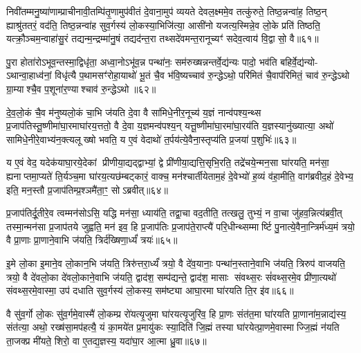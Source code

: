 {\anuvakamend[{का॒मये॑त॒ प्रति॑ष्ठित्यै प॒शून्थ्स॒प्तच॑त्वारिशच्च॥10॥}]}

निवी॑तम्मनु॒ष्या॑णाम्प्राचीनावी॒तम्पि॑तृ॒णामुप॑वीतं दे॒वाना॒मुप॑ व्ययते देवल॒क्ष्ममे॒व तत्कु॑रुते॒ तिष्ठ॒न्नन्वा॑ह॒ तिष्ठ॒न् ह्याश्रु॑ततरं॒ वद॑ति॒ तिष्ठ॒न्नन्वा॑ह सुव॒र्गस्य॑ लो॒कस्या॒भिजि॑त्या॒ आसी॑नो यजत्य॒स्मिन्ने॒व लो॒के प्रति॑ तिष्ठति॒ यत्क्रौ॒ञ्चम॒न्वाहा॑सु॒रं तद्यन्म॒न्द्रम्मा॑नु॒षं तद्यद॑न्त॒रा तथ्सदे॑वमन्त॒रानूच्यꣳ॑ सदेव॒त्वाय॑ वि॒द्वासो॒ वै॥६१॥

पु॒रा होता॑रोऽभूव॒न्तस्मा॒द्विधृ॑ता॒ अध्वा॒नोऽभू॑व॒न्न पन्था॑नः॒ सम॑रुख्षन्नन्तर्वे॒द्य॑न्यः पादो॒ भव॑ति बहिर्वे॒द्य॑न्यो- ऽथान्वा॒हाध्व॑नां॒ विधृ॑त्यै प॒थामसꣳ॑रोहा॒याथो॑ भू॒तं चै॒व भ॑वि॒ष्यच्चाव॑ रु॒न्द्धेऽथो॒ परि॑मितं चै॒वाप॑रिमितं॒ चाव॑ रु॒न्द्धेऽथो ग्रा॒म्याश्चै॒व प॒शूना॑र॒ण्याश्चाव॑ रु॒न्द्धेऽथो॥६२॥

दे॒व॒लो॒कं चै॒व म॑नुष्यलो॒कं चा॒भि ज॑यति दे॒वा वै सा॑मिधे॒नीर॒नूच्य॑ य॒ज्ञं नान्व॑पश्य॒न्थ्स प्र॒जाप॑तिस्तू॒ष्णीमा॑घा॒रमाघा॑रय॒त्ततो॒ वै दे॒वा य॒ज्ञमन्व॑पश्य॒न् यत्तू॒ष्णीमा॑घा॒रमा॑घा॒रय॑ति य॒ज्ञस्यानु॑ख्यात्या॒ अथो॑ सामिधे॒नीरे॒वाभ्य॑न॒क्त्यलूख्षो भवति॒ य ए॒वं वेदाथो॑ त॒र्पय॑त्ये॒वैना॒स्तृप्य॑ति प्र॒जया॑ प॒शुभिः॑॥६३॥

य ए॒वं वेद॒ यदेक॑याघा॒रये॒देकां प्रीणीया॒द्यद्द्वाभ्यां॒ द्वे प्री॑णीया॒द्यत्ति॒सृभि॒रति॒ तद्रे॑चये॒न्मन॒सा घा॑रयति॒ मन॑सा॒ ह्यनाप्तमा॒प्यते॑ ति॒र्यञ्च॒मा घा॑रय॒त्यछ॑म्बट्कारं॒ वाक्च॒ मन॑श्चार्तीयेताम॒हं दे॒वेभ्यो॑ ह॒व्यं व॑हा॒मीति॒ वाग॑ब्रवीद॒हं दे॒वेभ्य॒ इति॒ मन॒स्तौ प्र॒जाप॑तिम्प्र॒श्ञमै॑ता॒ꣳ॒ सोऽब्रवीत्॥६४॥

प्र॒जाप॑तिर्दू॒तीरे॒व त्वम्मन॑सोऽसि॒ यद्धि मन॑सा॒ ध्याय॑ति॒ तद्वा॒चा वद॒तीति॒ तत्खलु॒ तुभ्यं॒ न वा॒चा जु॑हव॒न्नित्य॑ब्रवी॒त् तस्मा॒न्मन॑सा प्र॒जाप॑तये जुह्वति॒ मन॑ इव॒ हि प्र॒जाप॑तिः प्र॒जाप॑ते॒राप्त्यै॑ परि॒धीन्थ्सम्मार्ष्टि पु॒नात्ये॒वैना॒न्त्रिर्म॑ध्य॒मं त्रयो॒ वै प्रा॒णाः प्रा॒णाने॒वाभि ज॑यति॒ त्रिर्द॑ख्षिणा॒र्ध्यं॑ त्रयः॑॥६५॥

इ॒मे लो॒का इ॒माने॒व लो॒कान॒भि ज॑यति॒ त्रिरु॑त्तरा॒र्ध्यं॑ त्रयो॒ वै दे॑व॒यानाः॒ पन्था॑न॒स्ताने॒वाभि ज॑यति॒ त्रिरुप॑ वाजयति॒ त्रयो॒ वै दे॑वलो॒का दे॑वलो॒काने॒वाभि ज॑यति॒ द्वाद॑श॒ सम्प॑द्यन्ते॒ द्वाद॑श॒ मासाः संवथ्स॒रः सं॑वथ्स॒रमे॒व प्री॑णा॒त्यथो॑ संवथ्स॒रमे॒वास्मा॒ उप॑ दधाति सुव॒र्गस्य॑ लो॒कस्य॒ सम॑ष्ट्या आघा॒रमा घा॑रयति ति॒र इ॑व॥६६॥

वै सु॑व॒र्गो लो॒कः सु॑व॒र्गमे॒वास्मै॑ लो॒कम्प्र रो॑यत्यृ॒जुमा घा॑रयत्यृ॒जुरि॑व॒ हि प्रा॒णः संत॑त॒मा घा॑रयति प्रा॒णाना॑म॒न्नाद्य॑स्य॒ संत॑त्या॒ अथो॒ रख्ष॑सा॒मप॑हत्यै॒ यं का॒मये॑त प्र॒मायु॑कः स्या॒दिति॑ जि॒ह्मं तस्या घा॑रयेत्प्रा॒णमे॒वास्माज्जि॒ह्मं न॑यति ता॒जक्प्र मी॑यते॒ शिरो॒ वा ए॒तद्य॒ज्ञस्य॒ यदा॑घा॒र आ॒त्मा ध्रु॒वा॥६७॥

